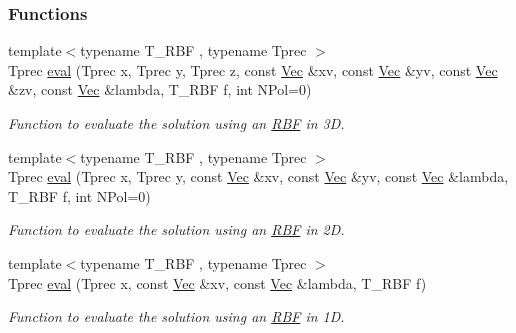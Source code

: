 \subsubsection*{Functions}
\begin{CompactItemize}
\item 
{\footnotesize template$<$typename T\_\-RBF , typename Tprec $>$ }\\Tprec \hyperlink{namespaceRBF_27e582398e80f1f030b0c98b8ced1619}{eval} (Tprec x, Tprec y, Tprec z, const \hyperlink{Traits_8hpp_327b06345fe9c9ae56c556c92b78272b}{Vec} \&xv, const \hyperlink{Traits_8hpp_327b06345fe9c9ae56c556c92b78272b}{Vec} \&yv, const \hyperlink{Traits_8hpp_327b06345fe9c9ae56c556c92b78272b}{Vec} \&zv, const \hyperlink{Traits_8hpp_327b06345fe9c9ae56c556c92b78272b}{Vec} \&lambda, T\_\-RBF f, int NPol=0)
\begin{CompactList}\small\item\em Function to evaluate the solution using an \hyperlink{namespaceRBF}{RBF} in 3D. \item\end{CompactList}\item 
{\footnotesize template$<$typename T\_\-RBF , typename Tprec $>$ }\\Tprec \hyperlink{namespaceRBF_59f05545d25b48ba53a9d121978d5dcb}{eval} (Tprec x, Tprec y, const \hyperlink{Traits_8hpp_327b06345fe9c9ae56c556c92b78272b}{Vec} \&xv, const \hyperlink{Traits_8hpp_327b06345fe9c9ae56c556c92b78272b}{Vec} \&yv, const \hyperlink{Traits_8hpp_327b06345fe9c9ae56c556c92b78272b}{Vec} \&lambda, T\_\-RBF f, int NPol=0)
\begin{CompactList}\small\item\em Function to evaluate the solution using an \hyperlink{namespaceRBF}{RBF} in 2D. \item\end{CompactList}\item 
{\footnotesize template$<$typename T\_\-RBF , typename Tprec $>$ }\\Tprec \hyperlink{namespaceRBF_84e5cac73b8f80123c491d4629eec4fb}{eval} (Tprec x, const \hyperlink{Traits_8hpp_327b06345fe9c9ae56c556c92b78272b}{Vec} \&xv, const \hyperlink{Traits_8hpp_327b06345fe9c9ae56c556c92b78272b}{Vec} \&lambda, T\_\-RBF f)
\begin{CompactList}\small\item\em Function to evaluate the solution using an \hyperlink{namespaceRBF}{RBF} in 1D. \item\end{CompactList}\end{CompactItemize}


